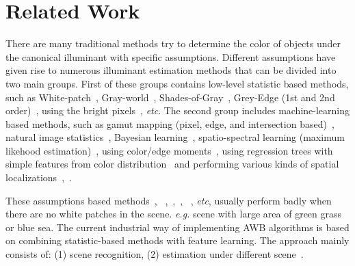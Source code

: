 \documentclass[10pt,twocolumn,letterpaper]{article}
\begin{document}
\section{Related Work}
There are many traditional methods try to determine the color of objects under the canonical illuminant
with specific assumptions.
Different assumptions have given rise to numerous illuminant estimation methods that
can be divided into two main groups.
First of these groups contains low-level statistic based methods, such as
White-patch~\cite{brainard1986analysis},
Gray-world~\cite{buchsbaum1980spatial},
Shades-of-Gray~\cite{finlayson2004shades}, Grey-Edge (1st and 2nd order)~\cite{van2007edge},
using the bright pixels~\cite{joze2012role}, \textit{etc}.
The second group includes machine-learning based methods, such as gamut mapping (pixel, edge, and intersection based)~\cite{barnard2000improvements},
natural image statistics~\cite{gijsenij2011color}, Bayesian learning~\cite{gehler2008bayesian},
spatio-spectral learning (maximum likehood estimation)~\cite{chakrabarti2012color}, using color/edge moments~\cite{finlayson2013corrected},
using regression trees with simple features from color distribution~\cite{cheng2015effective} and
performing various kinds of spatial localizations~\cite{barron2015convolutional},~\cite{DBLP:journals/corr/BarronT16}.

These assumptions based methods~\cite{brainard1986analysis},
~\cite{buchsbaum1980spatial},~\cite{finlayson2004shades},~\cite{van2007edge},
~\cite{joze2012role}, \textit{etc}, usually perform badly when there are no white patches in the scene.
\textit{e.g.} scene with large area of green grass or blue sea.
The current industrial way of implementing AWB algorithms is based on combining statistic-based methods with feature learning.
The approach mainly consists of: (1) scene recognition,
(2) estimation under different scene~\cite{battiato2012instant}.
\end{document}

